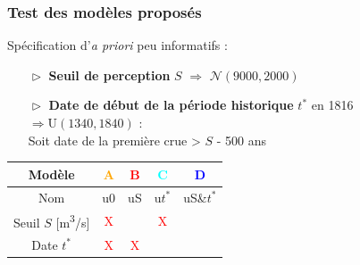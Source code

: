 \documentclass[compress,9pt]{beamer}
\begin{document}
	\begin{frame}[c]
		\frametitle{Test des modèles proposés}
		Spécification d'\textit{a priori} peu informatifs :
		\begin{itemize}
			\item [$\vartriangleright$] \textbf{Seuil de perception} $S$ $\Rightarrow$ $\mathcal{N}(9000,2000)$ \\
			\vfill
			\item [$\vartriangleright$] \textbf{Date de début de la période historique} $t^*$ en 1816 $\Rightarrow \mathrm{U}(1340,1840)$ :\\
			Soit date de la première crue > $S$ - 500 ans
		\end{itemize}
		\vfill
		\begin{table}
			\centering
			\begin{tabular}{c|c|c|c|c}
				Modèle & \textcolor{orange}{A} & \textcolor{red}{B} & \textcolor{cyan}{C} & \textcolor{blue}{D}\\ \hline
				Nom & u0 & uS & u$t^*$ & uS\&$t^*$ \\ \hline
				Seuil $S$ [m\textsuperscript{3}/s] & \textcolor{red}{X}  & \textcolor{green}{\checkmark} & \textcolor{red}{X}  & \textcolor{green}{\checkmark} \\ \hline
				Date $t^*$ & \textcolor{red}{X}  & \textcolor{red}{X}  & \textcolor{green}{\checkmark} & \textcolor{green}{\checkmark} \\ \hline
			\end{tabular}
		\end{table}
	\end{frame}

	
	
\end{document}
